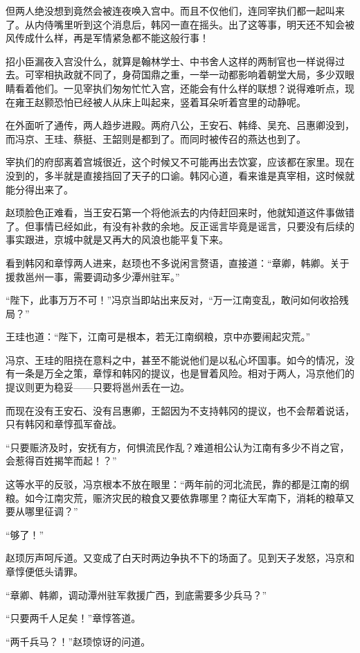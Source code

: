 但两人绝没想到竟然会被连夜唤入宫中。而且不仅他们，连同宰执们都一起叫来了。从内侍嘴里听到这个消息后，韩冈一直在摇头。出了这等事，明天还不知会被风传成什么样，再是军情紧急都不能这般行事！

招小臣漏夜入宫没什么，就算是翰林学士、中书舍人这样的两制官也一样说得过去。可宰相执政就不同了，身荷国鼎之重，一举一动都影响着朝堂大局，多少双眼睛看着他们。一见宰执们匆匆忙忙入宫，还能会有什么样的联想？说得难听点，现在雍王赵颢恐怕已经被人从床上叫起来，竖着耳朵听着宫里的动静呢。

在外面听了通传，两人趋步进殿。两府八公，王安石、韩绛、吴充、吕惠卿没到，而冯京、王珪、蔡挺、王韶则是都到了。而同时被传召的燕达也到了。

宰执们的府邸离着宫城很近，这个时候又不可能再出去饮宴，应该都在家里。现在没到的，多半就是直接挡回了天子的口谕。韩冈心道，看来谁是真宰相，这时候就能分得出来了。

赵顼脸色正难看，当王安石第一个将他派去的内侍赶回来时，他就知道这件事做错了。但事情已经如此，有没有补救的余地。反正谣言毕竟是谣言，只要没有后续的事实跟进，京城中就是又再大的风浪也能平复下来。

看到韩冈和章惇两人进来，赵顼也不多说闲言赘语，直接道：“章卿，韩卿。关于援救邕州一事，需要调动多少潭州驻军。”

“陛下，此事万万不可！”冯京当即站出来反对，“万一江南变乱，敢问如何收拾残局？”

王珪也道：“陛下，江南可是根本，若无江南纲粮，京中亦要闹起灾荒。”

冯京、王珪的阻挠在意料之中，甚至不能说他们是以私心坏国事。如今的情况，没有一条是万全之策，章惇和韩冈的提议，也是冒着风险。相对于两人，冯京他们的提议则更为稳妥——只要将邕州丢在一边。

而现在没有王安石、没有吕惠卿，王韶因为不支持韩冈的提议，也不会帮着说话，只有韩冈和章惇孤军奋战。

“只要赈济及时，安抚有方，何惧流民作乱？难道相公认为江南有多少不肖之官，会惹得百姓揭竿而起！？”

这等水平的反驳，冯京根本不放在眼里：“两年前的河北流民，靠的都是江南的纲粮。如今江南灾荒，赈济灾民的粮食又要依靠哪里？南征大军南下，消耗的粮草又要从哪里征调？”

“够了！”

赵顼厉声呵斥道。又变成了白天时两边争执不下的场面了。见到天子发怒，冯京和章惇便低头请罪。

“章卿、韩卿，调动潭州驻军救援广西，到底需要多少兵马？”

“只要两千人足矣！”章惇答道。

“两千兵马？！”赵顼惊讶的问道。

